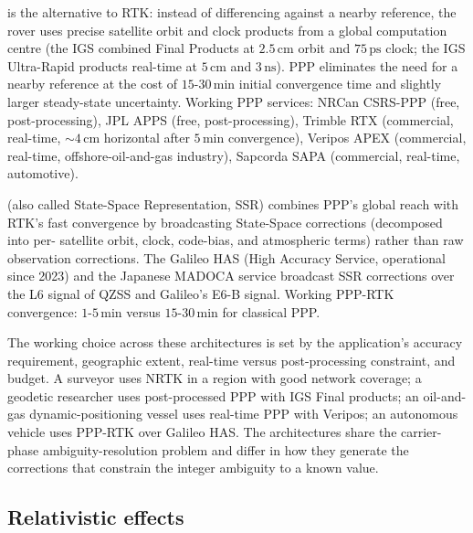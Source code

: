  is the alternative to
RTK: instead of differencing against a nearby reference, the
rover uses precise satellite orbit and clock products from a
global computation centre (the IGS combined Final Products at
$2.5\,\si{\centi\meter}$ orbit and $75\,\si{\pico\second}$ clock;
the IGS Ultra-Rapid products real-time at $5\,\si{\centi\meter}$
and $3\,\si{\nano\second}$). PPP eliminates the need for a nearby
reference at the cost of $15$-$30\,\si{\minute}$ initial
convergence time and slightly larger steady-state uncertainty.
Working PPP services: NRCan CSRS-PPP (free, post-processing),
JPL APPS (free, post-processing), Trimble RTX (commercial,
real-time, $\sim 4\,\si{\centi\meter}$ horizontal after
$5\,\si{\minute}$ convergence), Veripos APEX (commercial,
real-time, offshore-oil-and-gas industry), Sapcorda SAPA
(commercial, real-time, automotive).

 (also called State-Space Representation, SSR)
combines PPP's global reach with RTK's fast convergence by
broadcasting State-Space corrections (decomposed into per-
satellite orbit, clock, code-bias, and atmospheric terms) rather
than raw observation corrections. The Galileo HAS (High Accuracy
Service, operational since 2023) and the Japanese MADOCA service
broadcast SSR corrections over the L6 signal of QZSS and
Galileo's E6-B signal. Working PPP-RTK convergence: $1$-$5\,\si{
\minute}$ versus $15$-$30\,\si{\minute}$ for classical PPP.

The working choice across these architectures is set by the
application's accuracy requirement, geographic extent, real-time
versus post-processing constraint, and budget. A surveyor uses
NRTK in a region with good network coverage; a geodetic
researcher uses post-processed PPP with IGS Final products; an
oil-and-gas dynamic-positioning vessel uses real-time PPP with
Veripos; an autonomous vehicle uses PPP-RTK over Galileo HAS.
The architectures share the carrier-phase ambiguity-resolution
problem and differ in how they generate the corrections that
constrain the integer ambiguity to a known value.

\subsection{Relativistic effects}

